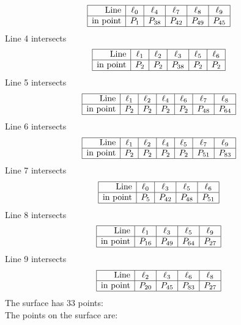 \documentclass{article}
\begin{document}
{$$\begin{array}{|r*{5}{|c}|}
\hline
\mbox{Line}  & \ell_{0} & \ell_{4} & \ell_{7} & \ell_{8} & \ell_{9}\\
\hline
\mbox{in point}  & P_{1} & P_{38} & P_{42} & P_{49} & P_{45}\\
\hline
\end{array}
$$
Line 4 intersects 
$$
\begin{array}{|r*{5}{|c}|}
\hline
\mbox{Line}  & \ell_{1} & \ell_{2} & \ell_{3} & \ell_{5} & \ell_{6}\\
\hline
\mbox{in point}  & P_{2} & P_{2} & P_{38} & P_{2} & P_{2}\\
\hline
\end{array}
$$
Line 5 intersects 
$$
\begin{array}{|r*{6}{|c}|}
\hline
\mbox{Line}  & \ell_{1} & \ell_{2} & \ell_{4} & \ell_{6} & \ell_{7} & \ell_{8}\\
\hline
\mbox{in point}  & P_{2} & P_{2} & P_{2} & P_{2} & P_{48} & P_{64}\\
\hline
\end{array}
$$
Line 6 intersects 
$$
\begin{array}{|r*{6}{|c}|}
\hline
\mbox{Line}  & \ell_{1} & \ell_{2} & \ell_{4} & \ell_{5} & \ell_{7} & \ell_{9}\\
\hline
\mbox{in point}  & P_{2} & P_{2} & P_{2} & P_{2} & P_{51} & P_{83}\\
\hline
\end{array}
$$
Line 7 intersects 
$$
\begin{array}{|r*{4}{|c}|}
\hline
\mbox{Line}  & \ell_{0} & \ell_{3} & \ell_{5} & \ell_{6}\\
\hline
\mbox{in point}  & P_{5} & P_{42} & P_{48} & P_{51}\\
\hline
\end{array}
$$
Line 8 intersects 
$$
\begin{array}{|r*{4}{|c}|}
\hline
\mbox{Line}  & \ell_{1} & \ell_{3} & \ell_{5} & \ell_{9}\\
\hline
\mbox{in point}  & P_{16} & P_{49} & P_{64} & P_{27}\\
\hline
\end{array}
$$
Line 9 intersects 
$$
\begin{array}{|r*{4}{|c}|}
\hline
\mbox{Line}  & \ell_{2} & \ell_{3} & \ell_{6} & \ell_{8}\\
\hline
\mbox{in point}  & P_{20} & P_{45} & P_{83} & P_{27}\\
\hline
\end{array}
$$
The surface has 33 points:\\
The points on the surface are:\\
}
\end{document}
